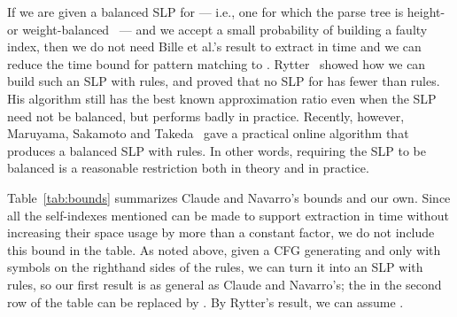 \documentclass[review]{elsarticle}
\begin{document}
If we are given a balanced SLP for  --- i.e., one for which the parse tree is height- or weight-balanced~\cite{CLRS01} --- and we accept a small probability of building a faulty index, then we do not need Bille et al.'s result to extract in  time and we can reduce the time bound for pattern matching to .  Rytter~\cite{Ryt03} showed how we can build such an SLP with  rules, and proved that no SLP for  has fewer than  rules.  His algorithm still has the best known approximation ratio even when the SLP need not be balanced, but performs badly in practice.  Recently, however, Maruyama, Sakamoto and Takeda~\cite{MST12} gave a practical online algorithm that produces a balanced SLP with  rules.  In other words, requiring the SLP to be balanced is a reasonable restriction both in theory and in practice.

Table~\ref{tab:bounds} summarizes Claude and Navarro's bounds and our own.  Since all the self-indexes mentioned can be made to support extraction in  time without increasing their space usage by more than a constant factor, we do not include this bound in the table.  As noted above, given a CFG generating  and only  with  symbols on the righthand sides of the rules, we can turn it into an SLP with  rules, so our first result is as general as Claude and Navarro's; the  in the second row of the table can be replaced by .  By Rytter's result, we can assume .
\end{document}
